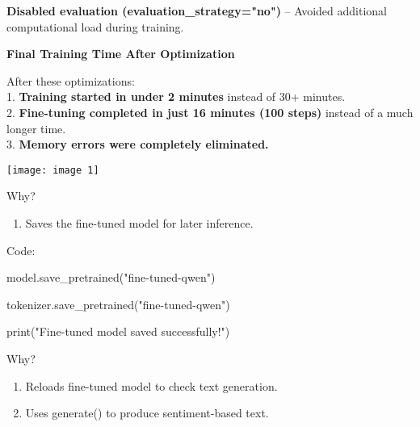 \documentclass{article} %
\begin{document}
\begin{flushleft}
\noindent \textbf{Disabled evaluation (evaluation\_strategy="no")} -- Avoided additional computational load during training.
\newline

\noindent \textbf{Final Training Time After Optimization}

\noindent After these optimizations:
\\
1.\textbf{ Training started in under 2 minutes} instead of 30+ minutes.
\\
2. \textbf{Fine-tuning completed in just 16 minutes (100 steps)} instead of a much longer time.
\\
3. \textbf{Memory errors were completely eliminated.}

\noindent \texttt{[image: image 1]}

\noindent 

\noindent 
\newline

\noindent \textbf{}
\newline

\noindent Why?
\end{flushleft}

\begin{enumerate}
\item  Saves the fine-tuned model for later inference.
\end{enumerate}

\noindent \begin{flushleft}
Code:

\noindent model.save\_pretrained("fine-tuned-qwen")

\noindent tokenizer.save\_pretrained("fine-tuned-qwen")

\noindent print("Fine-tuned model saved successfully!")

\noindent 
\newline

\noindent \textbf{}
\newline

\noindent Why?
\end{flushleft}

\begin{enumerate}
\item  Reloads fine-tuned model to check text generation.

\item  Uses generate() to produce sentiment-based text.
\end{enumerate}
\end{document}
